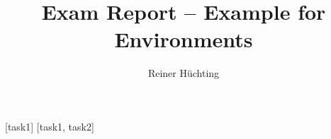 \documentclass[a4paper]{scrartcl}
\begin{document}
    \title{Exam Report -- Example for Environments}
    \author{Reiner Hüchting}

    \maketitle

    \begin{examreport}[submissions]
        [task1]
        [task1, task2]
    \end{examreport}
\end{document}
